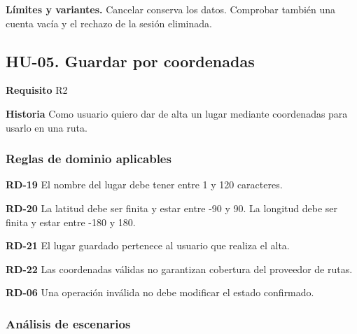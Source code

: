 {\fontsize{9}{11.8}\selectfont\textbf{Límites y variantes.} Cancelar conserva los datos. Comprobar también una cuenta vacía y el rechazo de la sesión eliminada.\par}\vspace{4pt}
\clearpage\subsection*{HU-05. Guardar por coordenadas}

\textbf{Requisito} R2\par

\textbf{Historia} Como usuario quiero dar de alta un lugar mediante coordenadas para usarlo en una ruta.\par

\subsubsection*{Reglas de dominio aplicables}

\textbf{RD-19} El nombre del lugar debe tener entre 1 y 120 caracteres.\par

\textbf{RD-20} La latitud debe ser finita y estar entre -90 y 90. La longitud debe ser finita y estar entre -180 y 180.\par

\textbf{RD-21} El lugar guardado pertenece al usuario que realiza el alta.\par

\textbf{RD-22} Las coordenadas válidas no garantizan cobertura del proveedor de rutas.\par

\textbf{RD-06} Una operación inválida no debe modificar el estado confirmado.\par

\subsubsection*{Análisis de escenarios}

